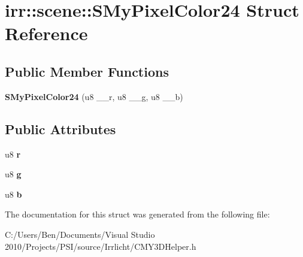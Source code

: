 \hypertarget{structirr_1_1scene_1_1_s_my_pixel_color24}{\section{irr\-:\-:scene\-:\-:S\-My\-Pixel\-Color24 Struct Reference}
\label{structirr_1_1scene_1_1_s_my_pixel_color24}
}
\subsection*{Public Member Functions}
\begin{DoxyCompactItemize}
\item 
\hypertarget{structirr_1_1scene_1_1_s_my_pixel_color24_a7091c884a4f73203c720526ea3e9c513}{{\bfseries S\-My\-Pixel\-Color24} (u8 \-\_\-\-\_\-r, u8 \-\_\-\-\_\-g, u8 \-\_\-\-\_\-b)}\label{structirr_1_1scene_1_1_s_my_pixel_color24_a7091c884a4f73203c720526ea3e9c513}

\end{DoxyCompactItemize}
\subsection*{Public Attributes}
\begin{DoxyCompactItemize}
\item 
\hypertarget{structirr_1_1scene_1_1_s_my_pixel_color24_ad76b56683f1dfe34aa51db1b3d29bc6c}{u8 {\bfseries r}}\label{structirr_1_1scene_1_1_s_my_pixel_color24_ad76b56683f1dfe34aa51db1b3d29bc6c}

\item 
\hypertarget{structirr_1_1scene_1_1_s_my_pixel_color24_ad112f9f3e6b358aba36caff9cf2931a3}{u8 {\bfseries g}}\label{structirr_1_1scene_1_1_s_my_pixel_color24_ad112f9f3e6b358aba36caff9cf2931a3}

\item 
\hypertarget{structirr_1_1scene_1_1_s_my_pixel_color24_a1d75ab216b009af2cdbe2038f1f9fe15}{u8 {\bfseries b}}\label{structirr_1_1scene_1_1_s_my_pixel_color24_a1d75ab216b009af2cdbe2038f1f9fe15}

\end{DoxyCompactItemize}


The documentation for this struct was generated from the following file\-:\begin{DoxyCompactItemize}
\item 
C\-:/\-Users/\-Ben/\-Documents/\-Visual Studio 2010/\-Projects/\-P\-S\-I/source/\-Irrlicht/C\-M\-Y3\-D\-Helper.\-h\end{DoxyCompactItemize}

